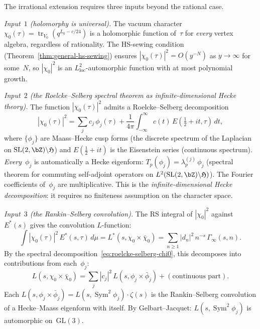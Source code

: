 \begin{remark}
The irrational extension requires three inputs beyond the rational
case.

\smallskip
\emph{Input~$1$
\textup{(}holomorphy is universal\textup{)}.}
The vacuum character
$\chi_0(\tau) = \operatorname{tr}_{V_0}(q^{L_0-c/24})$ is a
holomorphic function of~$\tau$ for \emph{every} vertex algebra,
regardless of rationality. The HS-sewing condition
(Theorem~\ref{thm:general-hs-sewing}) ensures
$|\chi_0(\tau)|^2 = O(y^{-N})$ as $y \to \infty$ for some~$N$,
so $|\chi_0|^2$ is an $L^2_{\mathrm{loc}}$-automorphic function
with at most polynomial growth.

\smallskip
\emph{Input~$2$
\textup{(}the Roelcke--Selberg spectral theorem as
infinite-dimensional Hecke theory\textup{)}.}
The function $|\chi_0(\tau)|^2$ admits a Roelcke--Selberg
decomposition
\begin{equation}\label{eq:roelcke-selberg-chi0}
 |\chi_0(\tau)|^2
 = \sum_{j} c_j\,\phi_j(\tau)
 + \frac{1}{4\pi}\int_{-\infty}^{\infty}
 c(t)\,E(\tfrac12+it,\tau)\,dt,
\end{equation}
where $\{\phi_j\}$ are Maass--Hecke cusp forms (the discrete
spectrum of the Laplacian on
$\mathrm{SL}(2,\bZ)\backslash\mathfrak{H}$) and $E(\tfrac12+it)$
is the Eisenstein series (continuous spectrum).
\emph{Every}~$\phi_j$ is automatically a Hecke eigenform:
$T_p(\phi_j) = \lambda_p^{(j)}\,\phi_j$
(spectral theorem for commuting self-adjoint operators on
$L^2(\mathrm{SL}(2,\bZ)\backslash\mathfrak{H})$).
The Fourier coefficients of~$\phi_j$ are multiplicative.
This is the \emph{infinite-dimensional Hecke decomposition}:
it requires no finiteness assumption on the character space.

\smallskip
\emph{Input~$3$
\textup{(}the Rankin--Selberg convolution\textup{)}.}
The RS integral of $|\chi_0|^2$ against~$E^*(s)$ gives the
convolution $L$-function:
\[
 \int |\chi_0(\tau)|^2\,E^*(s,\tau)\,d\mu
 = L^*(s, \chi_0 \times \bar\chi_0)
 = \sum_{n \ge 1} |d_n|^2\,n^{-s}\,\Gamma_\infty(s,n).
\]
By the spectral decomposition~\eqref{eq:roelcke-selberg-chi0},
this decomposes into contributions from each~$\phi_j$:
\[
 L(s, \chi_0 \times \bar\chi_0)
 = \sum_j |c_j|^2\,
 L(s, \phi_j \times \bar\phi_j)
 + (\text{continuous part}).
\]
Each $L(s, \phi_j \times \bar\phi_j)
= L(s, \operatorname{Sym}^2 \phi_j) \cdot \zeta(s)$ is the
Rankin--Selberg convolution of a Hecke--Maass eigenform with
itself. By Gelbart--Jacquet:
$L(s, \operatorname{Sym}^2 \phi_j)$ is automorphic
on~$\mathrm{GL}(3)$.


\end{remark}
